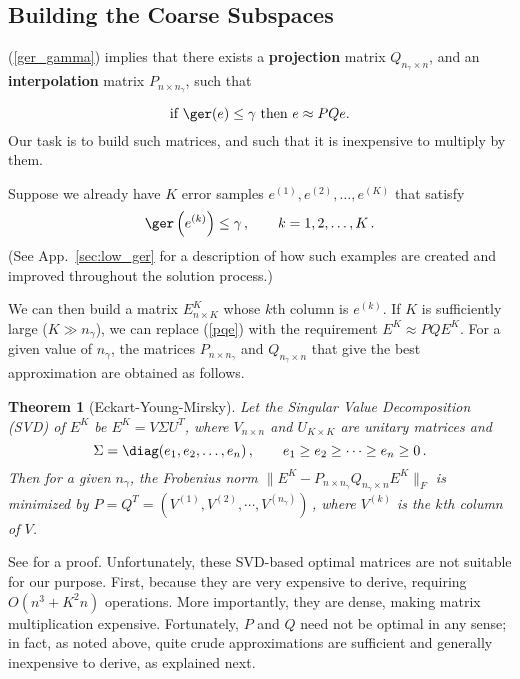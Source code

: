 \documentclass{article} %
\newtheorem{theorem}{Theorem}
\begin{document}
\subsection{Building the Coarse Subspaces}
\label{sec:w_gamma}

(\ref{ger_gamma}) implies that there exists a \textbf{projection} matrix $Q_{n_{\gamma} \times n}$, and an \textbf{interpolation} matrix $P_{n \times n_{\gamma}}$, such that

\begin{equation}
	{\mbox{if $\ger(e) \leq \gamma$ then $e \approx P Q e$.}}
	\label{pqe}
\end{equation}
Our task is to build such matrices, and such that it is inexpensive to multiply by them.

Suppose we already have $K$ error samples $e^{(1)}, e^{(2)}, \dots, e^{(K)}$ that satisfy
\begin{equation}
	\ger\left(e^{(k)} \right) \leq \gamma\,, \qquad k = 1, 2, \dots, K\,.
	\label{ger_ek}
\end{equation}
(See App.~\ref{sec:low_ger} for a description of how such examples are created and improved throughout the solution process.)

We can then build a matrix $E^K_{n \times K}$ whose $k$th column is $e^{(k)}$. If $K$ is sufficiently large ($K \gg n_{\gamma}$), we can replace (\ref{pqe}) with the requirement $E^K \approx P Q E^K$. For a given value of $n_{\gamma}$, the matrices $P_{n \times n_{\gamma}}$ and $Q_{n_{\gamma} \times n}$ that give the best approximation are obtained as follows.

\begin{theorem}[Eckart-Young-Mirsky]
Let the Singular Value Decomposition (SVD) of $E^K$ be $E^K = V \Sigma U^T$, where $V_{n \times n}$ and $U_{K \times K}$ are unitary matrices and 
$$
	\Sigma = \diag(e_1, e_2, \dots, e_n)\,,\qquad e_1 \geq e_2 \geq \cdots \geq e_n \geq 0\,.
$$
Then for a given $n_{\gamma}$, the Frobenius norm $\|E^K - P_{n \times n_{\gamma}} Q_{n_{\gamma} \times n} E^K\|_F$ is minimized by $P = Q^T = (V^{(1)}, V^{(2)}, \cdots, V^{(n_{\gamma})})$\,, where $V^{(k)}$ is the $k$th column of $V$.
\end{theorem}

See \cite{eym} for a proof. Unfortunately, these SVD-based optimal matrices are not suitable for our purpose. First, because they are very expensive to derive, requiring $O(n^3 + K^2 n)$ operations. More importantly, they are dense, making matrix multiplication expensive. Fortunately, $P$ and $Q$ need not be optimal in any sense; in fact, as noted above, quite crude approximations are sufficient and generally inexpensive to derive, as explained next.
\end{document}
